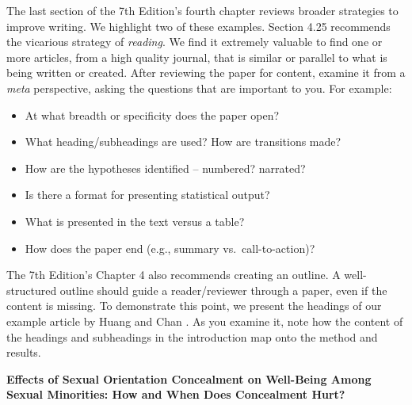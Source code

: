 \documentclass[
  11pt,
]{book}
\providecommand{\tightlist}{%
  \setlength{\itemsep}{0pt}\setlength{\parskip}{0pt}}
\begin{document}
The last section of the 7th Edition's fourth chapter reviews broader strategies to improve writing. We highlight two of these examples. Section 4.25 recommends the vicarious strategy of \emph{reading}. We find it extremely valuable to find one or more articles, from a high quality journal, that is similar or parallel to what is being written or created. After reviewing the paper for content, examine it from a \emph{meta} perspective, asking the questions that are important to you. For example:

\begin{itemize}
\tightlist
\item
  At what breadth or specificity does the paper open?\\
\item
  What heading/subheadings are used? How are transitions made?
\item
  How are the hypotheses identified -- numbered? narrated?
\item
  Is there a format for presenting statistical output?
\item
  What is presented in the text versus a table?
\item
  How does the paper end (e.g., summary vs.~call-to-action)?
\end{itemize}

The 7th Edition's Chapter 4 also recommends creating an outline. A well-structured outline should guide a reader/reviewer through a paper, even if the content is missing. To demonstrate this point, we present the headings of our example article by Huang and Chan \citeyearpar{huang_effects_2022}. As you examine it, note how the content of the headings and subheadings in the introduction map onto the method and results.

\textbf{Effects of Sexual Orientation Concealment on Well-Being Among Sexual Minorities: How and When Does Concealment Hurt?}
\end{document}
